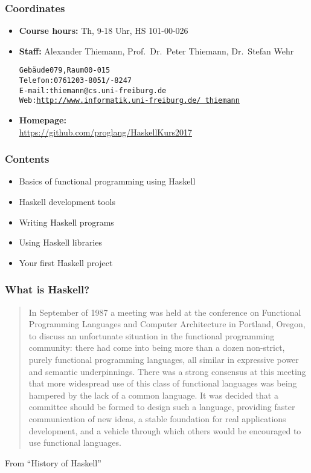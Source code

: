 \documentclass{beamer}
\begin{document}
\begin{frame}
  \titlepage
\end{frame}

\begin{frame}[fragile]
  \frametitle{Coordinates}
  \begin{itemize}
  \item \textbf{Course hours:}  Th, 9-18 Uhr, HS 101-00-026
  \item \textbf{Staff:}  Alexander Thiemann, Prof.\ Dr.\ Peter Thiemann,
    Dr.\ Stefan Wehr\\
\begin{alltt}
Gebäude 079, Raum 00-015 
Telefon: 0761 203 -8051/-8247
E-mail: thiemann@cs.uni-freiburg.de
Web: \href{http://www.informatik.uni-freiburg.de/~thiemann}{http://www.informatik.uni-freiburg.de/~thiemann}
\end{alltt}
  \item\textbf{Homepage:}\\ \footnotesize
    \href{https://github.com/proglang/HaskellKurs2017}{
      https://github.com/proglang/HaskellKurs2017}
  \end{itemize}
\end{frame}


\begin{frame}
  \frametitle{Contents}
  \begin{itemize}
  \item Basics of functional programming using Haskell
  \item Haskell development tools
  \item Writing Haskell programs
  \item Using Haskell libraries
  \item Your first Haskell project
  \end{itemize}
\end{frame}


\begin{frame}
  \frametitle{What is Haskell?}
  \begin{quotation}
    In September of 1987 a meeting was held at the conference on
    Functional Programming Languages and Computer Architecture in
    Portland, Oregon, to discuss an unfortunate situation in the
    functional programming community: there had come into being more
    than a dozen non-strict, purely functional programming languages,
    all similar in expressive power and semantic underpinnings. There
    was a strong consensus at this meeting that more widespread use
    of this class of functional languages was being hampered by the
    lack of a common language. It was decided that a committee should
    be formed to design such a language, providing faster
    communication of new ideas, a stable foundation for real
    applications development, and a vehicle through which others would 
    be encouraged to use functional languages. 
  \end{quotation}
  {\tiny From ``History of Haskell''}
\end{frame}
\end{document}
